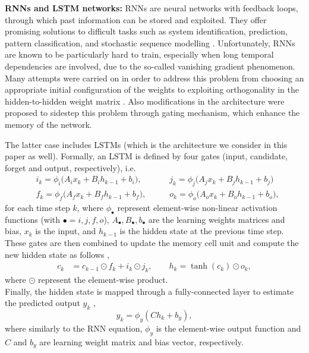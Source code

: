 \documentclass[runningheads]{llncs}
\begin{document}
\noindent \textbf{{RNNs and LSTM networks:}}
RNNs are neural networks with feedback loops, through which past information can be stored and exploited. They offer promising solutions to difficult tasks such as system identification, prediction, pattern classification, and stochastic sequence modelling \cite{Bay2016}.
Unfortunately, RNNs are known to be particularly hard to train, especially when long temporal dependencies are involved, due to the so-called vanishing gradient phenomenon. Many attempts were carried on in order to address this problem from choosing an appropriate initial configuration of the weights to exploiting orthogonality in the hidden-to-hidden weight matrix \cite{vorontsov2017orthogonality}. Also modifications in the architecture \cite{hochreiter1997} were proposed to sidestep this problem through gating mechanism, which enhance the memory of the network.

The latter case includes LSTMs (which is the architecture we consider in this paper as well). Formally, an LSTM is defined by four gates (input, candidate, forget and output, respectively), i.e. \cite{hochreiter1997}
\begin{eqnarray}
&i_k = \phi_i \bigg( A_i x_k + B_i h_{k-1} + b_i \bigg), \qquad
&j_k = \phi_j \bigg( A_j x_k + B_j h_{k-1} + b_j \bigg) \\
&f_k = \phi_f \bigg( A_f x_k + B_f h_{k-1} + b_f \bigg), \qquad
&o_k = \phi_o \bigg( A_o x_k + B_o h_{k-1} + b_o \bigg),
\end{eqnarray}
for each time step $k$, where $\phi_{\bullet}$ represent element-wise non-linear activation functions {(with $\bullet = i,j,f,o$)}, $A_{\bullet},B_{\bullet},b_{\bullet}$ are the learning weights matrices and bias, $x_k$ is the input, and $h_{k-1}$ is the hidden state at the previous time step. These gates are then combined to update the memory cell unit and compute the new hidden state as follows \cite{hochreiter1997},
\begin{align}
c_k &= c_{k-1} \odot f_k + i_k \odot j_k, \qquad
h_k = \tanh(c_k) \odot o_k,
\end{align}
where $\odot$ represent the element-wise product.
\\Finally, the hidden state is mapped through a fully-connected layer to estimate the predicted output $y_k$ \cite{hochreiter1997},
\begin{equation}\label{eq:outputLayer}
y_k = \phi_y (C h_k + b_y ),
\end{equation}
where similarly to the RNN equation, $\phi_y$ is the element-wise output function and $C$ and $b_y$ are learning weight matrix and bias vector, respectively.
\end{document}
